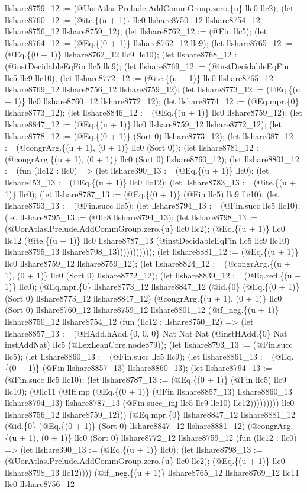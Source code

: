 \documentclass[11pt]{article}
\begin{document}
llshare8759\_12 := (@UorAtlas.Prelude.AddCommGroup.zero.\{u\} llc0 llc2); (let llshare8760\_12 := (@ite.\{(u + 1)\} llc0 llshare8750\_12 llshare8754\_12 llshare8756\_12 llshare8759\_12); (let llshare8762\_12 := (@Fin llc5); (let llshare8764\_12 := (@Eq.\{(0 + 1)\} llshare8762\_12 llc9); (let llshare8765\_12 := (@Eq.\{(0 + 1)\} llshare8762\_12 llc9 llc10); (let llshare8768\_12 := (@instDecidableEqFin llc5 llc9); (let llshare8769\_12 := (@instDecidableEqFin llc5 llc9 llc10); (let llshare8772\_12 := (@ite.\{(u + 1)\} llc0 llshare8765\_12 llshare8769\_12 llshare8756\_12 llshare8759\_12); (let llshare8773\_12 := (@Eq.\{(u + 1)\} llc0 llshare8760\_12 llshare8772\_12); (let llshare8774\_12 := (@Eq.mpr.\{0\} llshare8773\_12); (let llshare8846\_12 := (@Eq.\{(u + 1)\} llc0 llshare8759\_12); (let llshare8847\_12 := (@Eq.\{(u + 1)\} llc0 llshare8759\_12 llshare8772\_12); (let llshare8778\_12 := (@Eq.\{(0 + 1)\} (Sort 0) llshare8773\_12); (let llshare387\_12 := (@congrArg.\{(u + 1), (0 + 1)\} llc0 (Sort 0)); (let llshare8781\_12 := (@congrArg.\{(u + 1), (0 + 1)\} llc0 (Sort 0) llshare8760\_12); (let llshare8801\_12 := (fun (llc12 : llc0) => (let llshare390\_13 := (@Eq.\{(u + 1)\} llc0); (let llshare453\_13 := (@Eq.\{(u + 1)\} llc0 llc12); (let llshare8783\_13 := (@ite.\{(u + 1)\} llc0); (let llshare8787\_13 := (@Eq.\{(0 + 1)\} (@Fin llc5) llc9 llc10); (let llshare8793\_13 := (@Fin.succ llc5); (let llshare8794\_13 := (@Fin.succ llc5 llc10); (let llshare8795\_13 := (@llc8 llshare8794\_13); (let llshare8798\_13 := (@UorAtlas.Prelude.AddCommGroup.zero.\{u\} llc0 llc2); (@Eq.\{(u + 1)\} llc0 llc12 (@ite.\{(u + 1)\} llc0 llshare8787\_13 (@instDecidableEqFin llc5 llc9 llc10) llshare8795\_13 llshare8798\_13))))))))))); (let llshare8881\_12 := (@Eq.\{(u + 1)\} llc0 llshare8759\_12 llshare8759\_12); (let llshare8824\_12 := (@congrArg.\{(u + 1), (0 + 1)\} llc0 (Sort 0) llshare8772\_12); (let llshare8839\_12 := (@Eq.refl.\{(u + 1)\} llc0); (@Eq.mpr.\{0\} llshare8773\_12 llshare8847\_12 (@id.\{0\} (@Eq.\{(0 + 1)\} (Sort 0) llshare8773\_12 llshare8847\_12) (@congrArg.\{(u + 1), (0 + 1)\} llc0 (Sort 0) llshare8760\_12 llshare8759\_12 llshare8801\_12 (@if\_neg.\{(u + 1)\} llshare8750\_12 llshare8754\_12 (fun (llc12 : llshare8750\_12) => (let llshare8857\_13 := (@HAdd.hAdd.\{0, 0, 0\} Nat Nat Nat (@instHAdd.\{0\} Nat instAddNat) llc5 (@LexLeanCore.node879)); (let llshare8793\_13 := (@Fin.succ llc5); (let llshare8860\_13 := (@Fin.succ llc5 llc9); (let llshare8861\_13 := (@Eq.\{(0 + 1)\} (@Fin llshare8857\_13) llshare8860\_13); (let llshare8794\_13 := (@Fin.succ llc5 llc10); (let llshare8787\_13 := (@Eq.\{(0 + 1)\} (@Fin llc5) llc9 llc10); (@llc11 (@Iff.mp (@Eq.\{(0 + 1)\} (@Fin llshare8857\_13) llshare8860\_13 llshare8794\_13) llshare8787\_13 (@Fin.succ\_inj llc5 llc9 llc10) llc12))))))))) llc0 llshare8756\_12 llshare8759\_12))) (@Eq.mpr.\{0\} llshare8847\_12 llshare8881\_12 (@id.\{0\} (@Eq.\{(0 + 1)\} (Sort 0) llshare8847\_12 llshare8881\_12) (@congrArg.\{(u + 1), (0 + 1)\} llc0 (Sort 0) llshare8772\_12 llshare8759\_12 (fun (llc12 : llc0) => (let llshare390\_13 := (@Eq.\{(u + 1)\} llc0); (let llshare8798\_13 := (@UorAtlas.Prelude.AddCommGroup.zero.\{u\} llc0 llc2); (@Eq.\{(u + 1)\} llc0 llshare8798\_13 llc12)))) (@if\_neg.\{(u + 1)\} llshare8765\_12 llshare8769\_12 llc11 llc0 llshare8756\_12 
\end{document}
